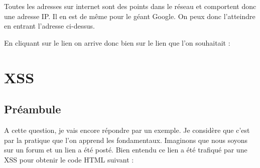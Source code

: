 \documentclass{article}
\begin{document}
Toutes les adresses sur internet sont des points dans le réseau et comportent donc une adresse IP. Il en est de même pour le géant Google. On peux donc l'atteindre en entrant l'adresse ci-dessus.
\vspace{0.2cm}\\
\vspace{0.2cm}

En cliquant sur le lien on arrive donc bien sur le lien que l'on souhaitait :
\vspace{0.2cm}\\
\vspace{0.2cm}


\newpage
\section{XSS}
\subsection{Préambule}
A cette question, je vais encore répondre par un exemple. Je considère que c'est par la pratique que l'on apprend les fondamentaux. Imaginons que nous soyons sur un forum et un lien a été posté. Bien entendu ce lien a été trafiqué par une XSS pour obtenir le code HTML suivant :
\vspace{0.2cm}\\
\vspace{0.2cm}
\end{document}
